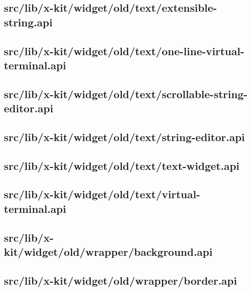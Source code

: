 \subsection{src/lib/x-kit/widget/old/text/extensible-string.api}


\subsection{src/lib/x-kit/widget/old/text/one-line-virtual-terminal.api}


\subsection{src/lib/x-kit/widget/old/text/scrollable-string-editor.api}


\subsection{src/lib/x-kit/widget/old/text/string-editor.api}


\subsection{src/lib/x-kit/widget/old/text/text-widget.api}


\subsection{src/lib/x-kit/widget/old/text/virtual-terminal.api}


\subsection{src/lib/x-kit/widget/old/wrapper/background.api}


\subsection{src/lib/x-kit/widget/old/wrapper/border.api}


